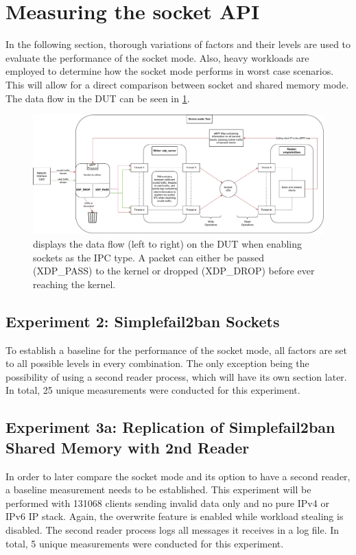 \section{Measuring the socket \ac{API}}
In the following section, thorough variations of factors and their levels are used to evaluate the performance of the socket mode.
Also, heavy workloads are employed to determine how the socket mode performs in worst case scenarios.
This will allow for a direct comparison between socket and shared memory mode.
The data flow in the \ac{DUT} can be seen in \ref{fig:socket:measurement}.

\begin{figure}[h!]
    \centerline{\includegraphics[width=1.2\textwidth]{images/MeasurementArchitecture.pdf}}
    \caption[\ac{DUT} during socket measurements]{
        displays the data flow (left to right) on the \ac{DUT} when enabling sockets as the \ac{IPC} type.
        A packet can either be passed (XDP\_PASS) to the kernel or dropped (XDP\_DROP) before ever reaching the kernel.}
	\label{fig:socket:measurement}
\end{figure}


\subsection{Experiment 2: Simplefail2ban Sockets}
To establish a baseline for the performance of the socket mode, all factors are set to all possible levels in every combination.
The only exception being the possibility of using a second reader process, which will have its own section later.
In total, 25 unique measurements were conducted for this experiment.

\subsection{Experiment 3a: Replication of Simplefail2ban Shared Memory with 2nd Reader}
In order to later compare the socket mode and its option to have a second reader, a baseline measurement needs to be established.
This experiment will be performed with 131068 clients sending invalid data only and no pure IPv4 or IPv6 \ac{IP} stack.
Again, the overwrite feature is enabled while workload stealing is disabled.
The second reader process logs all messages it receives in a log file.
In total, 5 unique measurements were conducted for this experiment.

